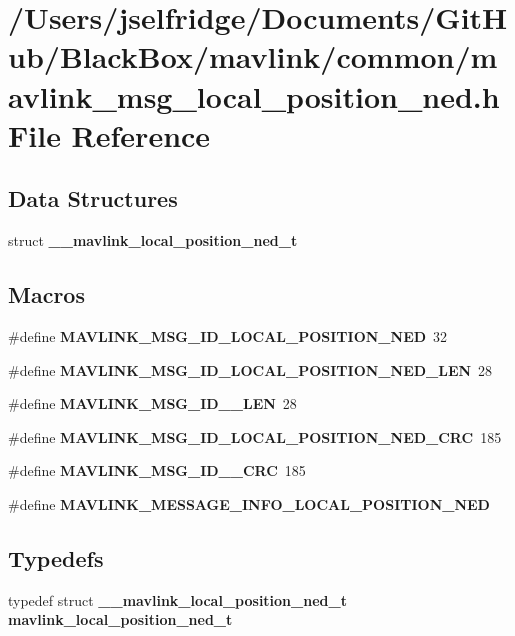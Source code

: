 \section{/\+Users/jselfridge/\+Documents/\+Git\+Hub/\+Black\+Box/mavlink/common/mavlink\+\_\+msg\+\_\+local\+\_\+position\+\_\+ned.h File Reference}
\label{mavlink__msg__local__position__ned_8h}
\subsection*{Data Structures}
\begin{DoxyCompactItemize}
\item 
struct \textbf{ \+\_\+\+\_\+mavlink\+\_\+local\+\_\+position\+\_\+ned\+\_\+t}
\end{DoxyCompactItemize}
\subsection*{Macros}
\begin{DoxyCompactItemize}
\item 
\#define \textbf{ M\+A\+V\+L\+I\+N\+K\+\_\+\+M\+S\+G\+\_\+\+I\+D\+\_\+\+L\+O\+C\+A\+L\+\_\+\+P\+O\+S\+I\+T\+I\+O\+N\+\_\+\+N\+ED}~32
\item 
\#define \textbf{ M\+A\+V\+L\+I\+N\+K\+\_\+\+M\+S\+G\+\_\+\+I\+D\+\_\+\+L\+O\+C\+A\+L\+\_\+\+P\+O\+S\+I\+T\+I\+O\+N\+\_\+\+N\+E\+D\+\_\+\+L\+EN}~28
\item 
\#define \textbf{ M\+A\+V\+L\+I\+N\+K\+\_\+\+M\+S\+G\+\_\+\+I\+D\+\_\+\_\+\+L\+EN}~28
\item 
\#define \textbf{ M\+A\+V\+L\+I\+N\+K\+\_\+\+M\+S\+G\+\_\+\+I\+D\+\_\+\+L\+O\+C\+A\+L\+\_\+\+P\+O\+S\+I\+T\+I\+O\+N\+\_\+\+N\+E\+D\+\_\+\+C\+RC}~185
\item 
\#define \textbf{ M\+A\+V\+L\+I\+N\+K\+\_\+\+M\+S\+G\+\_\+\+I\+D\+\_\+\_\+\+C\+RC}~185
\item 
\#define \textbf{ M\+A\+V\+L\+I\+N\+K\+\_\+\+M\+E\+S\+S\+A\+G\+E\+\_\+\+I\+N\+F\+O\+\_\+\+L\+O\+C\+A\+L\+\_\+\+P\+O\+S\+I\+T\+I\+O\+N\+\_\+\+N\+ED}
\end{DoxyCompactItemize}
\subsection*{Typedefs}
\begin{DoxyCompactItemize}
\item 
typedef struct \textbf{ \+\_\+\+\_\+mavlink\+\_\+local\+\_\+position\+\_\+ned\+\_\+t} \textbf{ mavlink\+\_\+local\+\_\+position\+\_\+ned\+\_\+t}
\end{DoxyCompactItemize}


